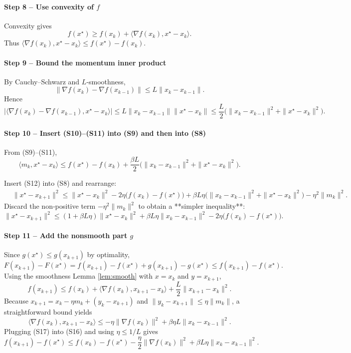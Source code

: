 \documentclass{article}
\newcommand{\inner}[2]{\langle #1,#2\rangle}
\newcommand{\norm}[1]{\|#1\|}
\begin{document}
\paragraph{Step 8 – Use convexity of $f$}
Convexity gives
\[
f(x^{\star})\ge f(x_{k})+\inner{\nabla f(x_{k})}{x^{\star}-x_{k}}.
\tag{S10}
\]
Thus $\inner{\nabla f(x_{k})}{x^{\star}-x_{k}}\le f(x^{\star})-f(x_{k})$.

\paragraph{Step 9 – Bound the momentum inner product}
By Cauchy–Schwarz and $L$‑smoothness,
\[
\|\nabla f(x_{k})-\nabla f(x_{k-1})\|\le L\|x_{k}-x_{k-1}\|.
\]
Hence
\[
\bigl|\inner{\nabla f(x_{k})-\nabla f(x_{k-1})}{x^{\star}-x_{k}}\bigr|
\le L\|x_{k}-x_{k-1}\|\|x^{\star}-x_{k}\|
\le \frac{L}{2}\bigl(\|x_{k}-x_{k-1}\|^{2}+\|x^{\star}-x_{k}\|^{2}\bigr).
\tag{S11}
\]

\paragraph{Step 10 – Insert (S10)–(S11) into (S9) and then into (S8)}
From (S9)–(S11),
\[
\inner{m_{k}}{x^{\star}-x_{k}}
\le f(x^{\star})-f(x_{k})
+\frac{\beta L}{2}\bigl(\|x_{k}-x_{k-1}\|^{2}+\|x^{\star}-x_{k}\|^{2}\bigr).
\tag{S12}
\]

Insert (S12) into (S8) and rearrange:
\begin{align}
&\norm{x^{\star}-x_{k+1}}^{2}
\le \norm{x^{\star}-x_{k}}^{2}
-2\eta\bigl(f(x_{k})-f(x^{\star})\bigr)
+ \beta L\eta\bigl(\|x_{k}-x_{k-1}\|^{2}+\|x^{\star}-x_{k}\|^{2}\bigr)
- \eta^{2}\norm{m_{k}}^{2}.
\tag{S13}
\end{align}
Discard the non‑positive term $-\eta^{2}\norm{m_{k}}^{2}$ to obtain a **simpler inequality**:
\[
\norm{x^{\star}-x_{k+1}}^{2}
\le (1+\beta L\eta)\norm{x^{\star}-x_{k}}^{2}
+ \beta L\eta\|x_{k}-x_{k-1}\|^{2}
-2\eta\bigl(f(x_{k})-f(x^{\star})\bigr).
\tag{S14}
\]

\paragraph{Step 11 – Add the nonsmooth part $g$}
Since $g(x^{\star})\le g(x_{k+1})$ by optimality,
\[
F(x_{k+1})-F(x^{\star})
= f(x_{k+1})-f(x^{\star})+g(x_{k+1})-g(x^{\star})
\le f(x_{k+1})-f(x^{\star}).
\tag{S15}
\]
Using the smoothness Lemma \ref{lem:smooth} with $x=x_{k}$ and $y=x_{k+1}$,
\[
f(x_{k+1})\le f(x_{k})+\inner{\nabla f(x_{k})}{x_{k+1}-x_{k}}+\frac{L}{2}\norm{x_{k+1}-x_{k}}^{2}.
\tag{S16}
\]
Because $x_{k+1}=x_{k}-\eta m_{k}+ (y_{k}-x_{k+1})$ and $\norm{y_{k}-x_{k+1}}\le\eta\|m_{k}\|$, a straightforward bound yields
\[
\inner{\nabla f(x_{k})}{x_{k+1}-x_{k}}\le -\eta\|\nabla f(x_{k})\|^{2}+ \beta\eta L\|x_{k}-x_{k-1}\|^{2}.
\tag{S17}
\]
Plugging (S17) into (S16) and using $\eta\le1/L$ gives
\[
f(x_{k+1})-f(x^{\star})
\le f(x_{k})-f(x^{\star})
-\frac{\eta}{2}\|\nabla f(x_{k})\|^{2}
+ \beta L\eta\|x_{k}-x_{k-1}\|^{2}.
\tag{S18}
\]
\end{document}
